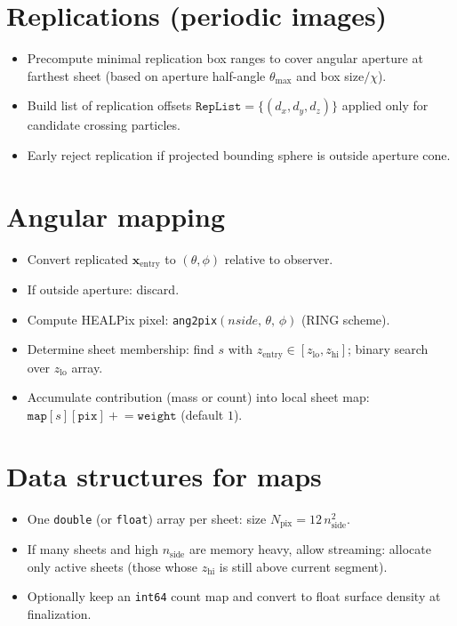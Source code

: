 \documentclass[11pt]{article}
\begin{document}
\section{Replications (periodic images)}
\begin{itemize}
  \item Precompute minimal replication box ranges to cover angular aperture at farthest sheet (based on aperture half-angle \(\theta_{\max}\) and box size\(/\chi\)).
  \item Build list of replication offsets \(\texttt{RepList} = \{(d_x,d_y,d_z)\}\) applied only for candidate crossing particles.
  \item Early reject replication if projected bounding sphere is outside aperture cone.
\end{itemize}

\section{Angular mapping}
\begin{itemize}
  \item Convert replicated \(\mathbf{x}_{\mathrm{entry}}\) to \((\theta,\phi)\) relative to observer.
  \item If outside aperture: discard.
  \item Compute HEALPix pixel: \texttt{ang2pix}\((nside,\, \theta,\, \phi)\) (RING scheme).
  \item Determine sheet membership: find \(s\) with \(z_{\mathrm{entry}} \in [z_{\mathrm{lo}}, z_{\mathrm{hi}}]\); binary search over \(z_{\mathrm{lo}}\) array.
  \item Accumulate contribution (mass or count) into local sheet map:
  \(\texttt{map}[s][\texttt{pix}] \mathrel{+}= \texttt{weight}\) (default \(1\)).
\end{itemize}

\section{Data structures for maps}
\begin{itemize}
  \item One \verb|double| (or \verb|float|) array per sheet: size \(N_{\mathrm{pix}} = 12\, n_{\mathrm{side}}^2\).
  \item If many sheets and high \(n_{\mathrm{side}}\) are memory heavy, allow streaming: allocate only active sheets (those whose \(z_{\mathrm{hi}}\) is still above current segment).
  \item Optionally keep an \verb|int64| count map and convert to float surface density at finalization.
\end{itemize}
\end{document}
